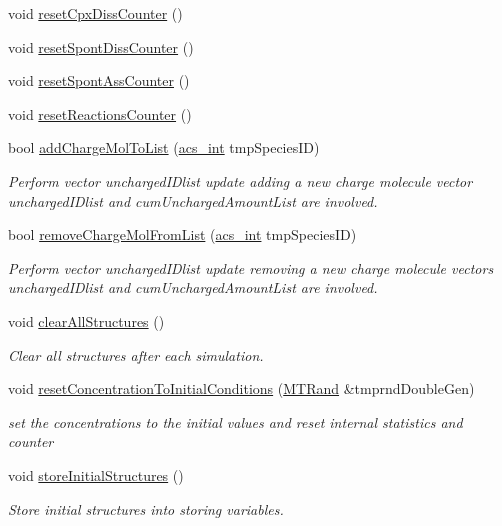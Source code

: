 \begin{DoxyCompactItemize}
void \hyperlink{a00011_a987dc7b9f211f34564343ee0eaa20dc1}{reset\-Cpx\-Diss\-Counter} ()
\item 
void \hyperlink{a00011_a9c22cb9b69207398e35c9c155e2e35ce}{reset\-Spont\-Diss\-Counter} ()
\item 
void \hyperlink{a00011_a98baed580212dad8ef48a22bfe7e1295}{reset\-Spont\-Ass\-Counter} ()
\item 
void \hyperlink{a00011_a5c8713237992b28c39199a7aea3f9ea0}{reset\-Reactions\-Counter} ()
\item 
bool \hyperlink{a00011_a7981c34d16c0b1e9e6ca3ea69aa3a8a3}{add\-Charge\-Mol\-To\-List} (\hyperlink{a00024_a8d277355641a098190360234e2ebde35}{acs\-\_\-int} tmp\-Species\-I\-D)
\begin{DoxyCompactList}\small\item\em Perform vector uncharged\-I\-Dlist update adding a new charge molecule vector uncharged\-I\-Dlist and cum\-Uncharged\-Amount\-List are involved. \end{DoxyCompactList}\item 
bool \hyperlink{a00011_aa4830018af0b99eddefcdefad877b305}{remove\-Charge\-Mol\-From\-List} (\hyperlink{a00024_a8d277355641a098190360234e2ebde35}{acs\-\_\-int} tmp\-Species\-I\-D)
\begin{DoxyCompactList}\small\item\em Perform vector uncharged\-I\-Dlist update removing a new charge molecule vectors uncharged\-I\-Dlist and cum\-Uncharged\-Amount\-List are involved. \end{DoxyCompactList}\item 
void \hyperlink{a00011_aa860227725dbe5b0251a25f440773161}{clear\-All\-Structures} ()
\begin{DoxyCompactList}\small\item\em Clear all structures after each simulation. \end{DoxyCompactList}\item 
void \hyperlink{a00011_ad8000316befe74598a123bdcd7024697}{reset\-Concentration\-To\-Initial\-Conditions} (\hyperlink{a00016}{M\-T\-Rand} \&tmprnd\-Double\-Gen)
\begin{DoxyCompactList}\small\item\em set the concentrations to the initial values and reset internal statistics and counter \end{DoxyCompactList}\item 
void \hyperlink{a00011_a7fc3937fb586db93c33f7f091dc99626}{store\-Initial\-Structures} ()
\begin{DoxyCompactList}\small\item\em Store initial structures into storing variables. \end{DoxyCompactList}\item 

\end{DoxyCompactItemize}
